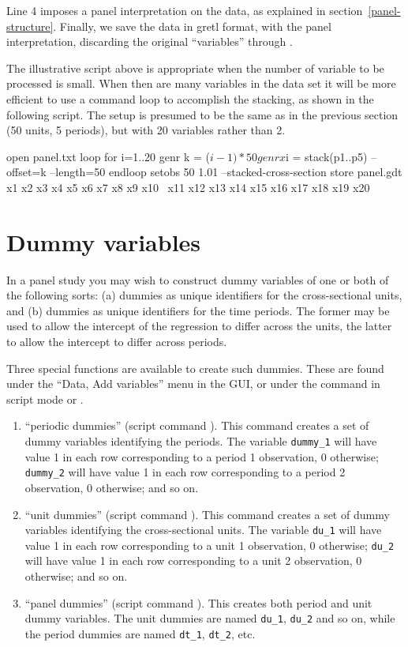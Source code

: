 Line 4 imposes a panel interpretation on the data, as explained in
section~\ref{panel-structure}.  Finally, we save the data in gretl
format, with the panel interpretation, discarding the original
``variables''  through .

The illustrative script above is appropriate when the number of
variable to be processed is small.  When then are many variables in
the data set it will be more efficient to use a command loop to
accomplish the stacking, as shown in the following script.  The setup
is presumed to be the same as in the previous section (50 units, 5
periods), but with 20 variables rather than 2.

\begin{code}
    open panel.txt
    loop for i=1..20
      genr k = ($i - 1) * 50
      genr x$i = stack(p1..p5) --offset=k --length=50
    endloop
    setobs 50 1.01 --stacked-cross-section
    store panel.gdt x1 x2 x3 x4 x5 x6 x7 x8 x9 x10 \
      x11 x12 x13 x14 x15 x16 x17 x18 x19 x20
\end{code}


\section{Dummy variables}
\label{dummies}

In a panel study you may wish to construct dummy variables of one or
both of the following sorts: (a) dummies as unique identifiers for the
cross-sectional units, and (b) dummies as unique identifiers for the
time periods.  The former may be used to allow the intercept of the
regression to differ across the units, the latter to allow the
intercept to differ across periods.

Three special functions are available to create such dummies.  These
are found under the ``Data, Add variables'' menu in the GUI, or under
the \cmd{genr} command in script mode or \app{gretlcli}.

\begin{enumerate}
\item ``periodic dummies'' (script command ).  This
  command creates a set of dummy variables identifying the periods.
  The variable \verb+dummy_1+ will have value 1 in each row
  corresponding to a period 1 observation, 0 otherwise; \verb+dummy_2+
  will have value 1 in each row corresponding to a period 2
  observation, 0 otherwise; and so on.
\item ``unit dummies'' (script command ).  This
  command creates a set of dummy variables identifying the
  cross-sectional units.  The variable \verb+du_1+ will have value 1
  in each row corresponding to a unit 1 observation, 0 otherwise;
  \verb+du_2+ will have value 1 in each row corresponding to a unit 2
  observation, 0 otherwise; and so on.
\item ``panel dummies'' (script command ).  This
  creates both period and unit dummy variables. The unit dummies are
  named \verb+du_1+, \verb+du_2+ and so on, while the period dummies
  are named \verb+dt_1+, \verb+dt_2+, etc.
\end{enumerate}

